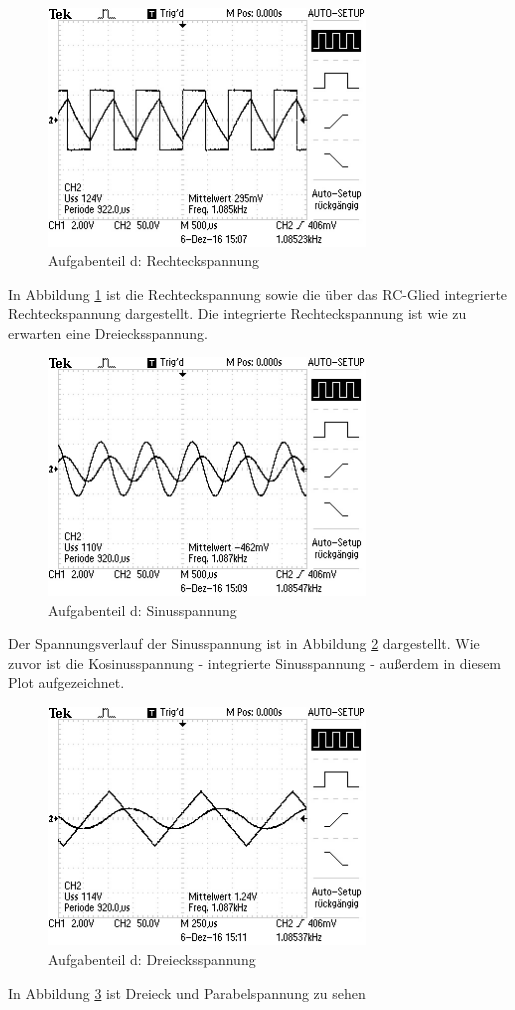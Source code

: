 \begin{figure}
	\centering
	\includegraphics[width=0.75\textwidth]{bilder/ALL0001/F0001TEK.JPG}
	\caption{Aufgabenteil d: Rechteckspannung}
	\label{fig:rechteck}
\end{figure}

In Abbildung \ref{fig:rechteck} ist die Rechteckspannung sowie die über das RC-Glied integrierte Rechteckspannung dargestellt.
Die integrierte Rechteckspannung ist wie zu erwarten eine Dreiecksspannung.


\begin{figure}
	\centering
	\includegraphics[width=0.75\textwidth]{bilder/ALL0002/F0002TEK.JPG}
	\caption{Aufgabenteil d: Sinusspannung}
	\label{fig:sinus}
\end{figure}

Der Spannungsverlauf der Sinusspannung ist in Abbildung \ref{fig:sinus} dargestellt. Wie zuvor ist die Kosinusspannung - integrierte Sinusspannung - außerdem in diesem Plot aufgezeichnet.


\begin{figure}
	\centering
	\includegraphics[width=0.75\textwidth]{bilder/ALL0003/F0003TEK.JPG}
	\caption{Aufgabenteil d: Dreiecksspannung}
	\label{fig:dreieck}
\end{figure}

In Abbildung \ref{fig:dreieck} ist Dreieck und Parabelspannung zu sehen

